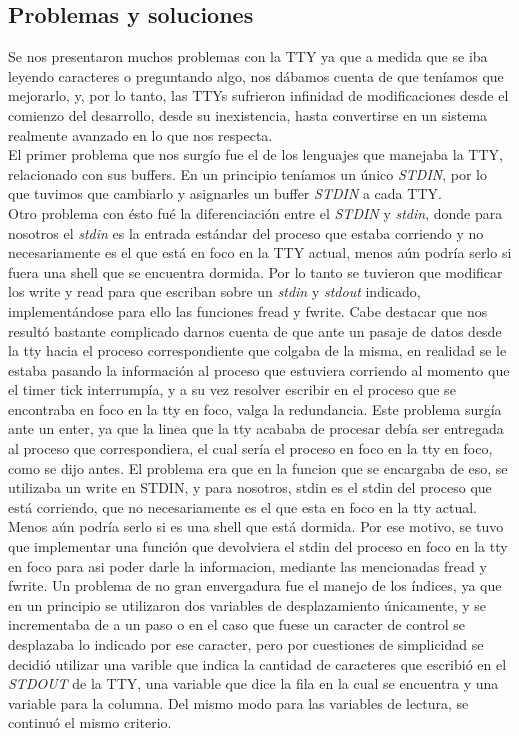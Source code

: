 \documentclass[10pt,a4paper]{article}
\begin{document}
	\subsection{Problemas y soluciones}
		Se nos presentaron muchos problemas con la TTY ya que a medida que se iba leyendo caracteres o preguntando algo, nos d\'abamos cuenta de que ten\'iamos que mejorarlo, y, por lo tanto, las TTYs sufrieron infinidad de modificaciones desde el comienzo del desarrollo, desde su inexistencia, hasta convertirse en un sistema realmente avanzado en lo que nos respecta.\\
		El primer problema que nos surg\'io fue el de los lenguajes que manejaba la TTY, relacionado con sus buffers. En un principio ten\'iamos un \'unico \textit{STDIN}, por lo que tuvimos que cambiarlo y asignarles un buffer \textit{STDIN} a cada TTY. \\
		Otro problema con \'esto fu\'e la diferenciaci\'on entre el \textit{STDIN} y \textit{stdin}, donde para nosotros el \textit{stdin} es la entrada est\'andar del proceso que estaba corriendo y no necesariamente es el que est\'a en foco en la TTY actual, menos a\'un podr\'ia serlo si fuera una shell que se encuentra dormida. Por lo tanto se tuvieron que modificar los write y read para que escriban sobre un \textit{stdin} y \textit{stdout} indicado, implement\'andose para ello las funciones fread y fwrite. Cabe destacar que nos result\'o bastante complicado darnos cuenta de que ante un pasaje de datos desde la tty hacia el proceso correspondiente que colgaba de la misma, en realidad se le estaba pasando la informaci\'on al proceso que estuviera corriendo al momento que el timer tick interrump\'ia, y a su vez resolver escribir en el proceso que se encontraba en foco en la tty en foco, valga la redundancia. Este problema surg\'ia ante un enter, ya que la linea que la tty acababa de procesar deb\'ia ser entregada al proceso que correspondiera, el cual ser\'ia el proceso en foco en la tty en foco, como se dijo antes. El problema era que en la funcion que se encargaba de eso, se utilizaba un write en STDIN, y para nosotros, stdin es el stdin del proceso que est\'a corriendo, que no necesariamente es el que esta en foco en la tty actual. Menos a\'un podr\'ia serlo si es una shell que est\'a dormida. Por ese motivo, se tuvo que implementar una funci\'on que devolviera el stdin del proceso en foco en la tty en foco para asi poder darle la informacion, mediante las mencionadas fread y fwrite.
		Un problema de no gran envergadura fue el manejo de los \'indices, ya que en un principio se utilizaron dos variables de desplazamiento \'unicamente, y se incrementaba de a un paso o en el caso que fuese un caracter de control se desplazaba lo indicado por ese caracter, pero por cuestiones de simplicidad se decidi\'o utilizar una varible que indica la cantidad de caracteres que escribi\'o en el \textit{STDOUT} de la TTY, una variable que dice la fila en la cual se encuentra y una variable para la columna. Del mismo modo para las variables de lectura, se continu\'o el mismo criterio.
\end{document}
